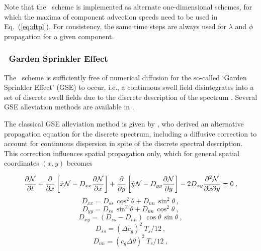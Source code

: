 Note that the \uq\ scheme is implemented as alternate one-dimensional schemes,
for which the maxima of component advection speeds need to be used in
Eq.~(\ref{eq:dtpl}). For consistency, the same time steps are always used for
$\lambda$ and $\phi$ propagation for a given component.


\vsssub
\subsubsection{~Garden Sprinkler Effect} \label{sec_GSE}
\vsssub

The \uq\ scheme is sufficiently free of numerical diffusion for the so-called
`Garden Sprinkler Effect' (GSE) to occur, i.e., a continuous swell field
disintegrates into a set of discrete swell fields due to the discrete
description of the spectrum \citep[Fig.~3c]{art:BH87}. Several GSE alleviation
methods are available in \ws.

The classical GSE alleviation method is given by \cite{art:BH87}, who derived
an alternative propagation equation for the discrete spectrum, including a
diffusive correction to account for continuous dispersion in spite of the
discrete spectral description. This correction influences spatial propagation
only, which for general spatial coordinates $(x,y)$ becomes


\begin{equation}
\frac{\partial {\cal N}}{\partial t} +
\frac{\partial}{\partial x} \left [ \dot{x} {\cal N} 
           - D_{xx} \frac{\partial {\cal N}}{\partial x} \right ] +
\frac{\partial}{\partial y} \left [ \dot{y} {\cal N} 
           - D_{yy} \frac{\partial {\cal N}}{\partial y} \right ] -
2 D_{xy} \frac{\partial^2 {\cal N}}{\partial x \partial y} = 0
\: , \label{eq:d_bal_0}\end{equation}  \begin{equation}
D_{xx} = D_{ss} \, \cos^2 \theta + D_{nn} \, \sin^2 \theta
\: , \label{eq:Dxx} \end{equation} \begin{equation}
D_{yy} = D_{ss} \, \sin^2 \theta + D_{nn} \, \cos^2 \theta
\: , \label{eq:Dyy} \end{equation}  \begin{equation}
D_{xy} = ( D_{ss} - D_{nn} ) \, \cos \theta \, \sin \theta
\: , \label{eq:Dxy} \end{equation} \begin{equation}
D_{ss} = (\Delta c_g )^2 \: T_s / 12
\: , \label{eq:Dss} \end{equation} \begin{equation}
D_{nn} =  ( c_g \Delta \theta )^2 \: T_s / 12
\: , \label{eq:Dnn} \end{equation}

